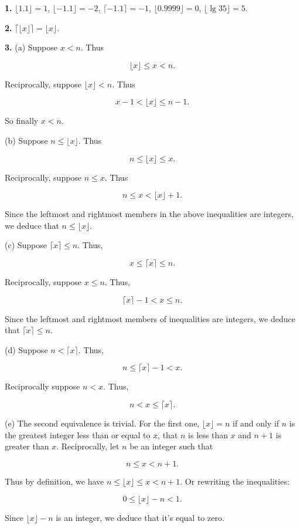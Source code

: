 \documentclass[a4paper,12pt]{article}
\newcommand{\newpar}[1]{\bigskip \noindent \textbf{#1.}}
\newcommand{\subpar}[1]{\medskip \noindent (#1)}
\begin{document}
\newpar{1} $\lfloor 1.1\rfloor = 1$, $\lfloor -1.1\rfloor = -2$,
$\lceil -1.1\rceil = -1$, $\lfloor 0.9999\rfloor = 0$, $\lfloor \lg
35\rfloor = 5$.

\newpar{2} $\lceil \lfloor x\rfloor \rceil = \lfloor x\rfloor$.

\newpar{3}
\subpar{a} Suppose $x < n$.  Thus

\[ \lfloor x\rfloor \le x < n.\]

Reciprocally, suppose $\lfloor x \rfloor < n$.  Thus

\[ x-1 < \lfloor x \rfloor \le n-1.\]

So finally $x < n$.

\medskip
\subpar{b} Suppose $n \le \lfloor x\rfloor$.  Thus

\[ n \le \lfloor x \rfloor \le x.\]

Reciprocally, suppose $n \le x$.  Thus

\[ n \le x < \lfloor x \rfloor + 1.\]

Since the leftmost and rightmost members in the above inequalities are
integers, we deduce that $n \le \lfloor x\rfloor$.

\subpar{c} Suppose $\lceil x\rceil \le n$.  Thus,

\[ x \le \lceil x\rceil \le n.\]

Reciprocally, suppose $x\le n$.  Thus,

\[ \lceil x\rceil - 1 < x \le n.\]

Since the leftmost and rightmost members of inequalities are integers,
we deduce that $\lceil x\rceil \le n$.

\medskip
\subpar{d} Suppose $n < \lceil x\rceil$.  Thus,

\[ n \le \lceil x\rceil - 1 < x.\]

Reciprocally suppose $n < x$.  Thus,

\[ n < x \le \lceil x\rceil.\]

\medskip
\subpar{e}  The second equivalence is trivial.  For the first one,
$\lfloor x\rfloor = n$ if and only if $n$ is the greatest integer less
than or equal to $x$, that $n$ is less than $x$ and $n+1$ is greater
than $x$.  Reciprocally, let $n$ be an integer such that

\[ n \le x < n+1.\]

Thus by definition, we have $n \le \lfloor x\rfloor \le x < n+1$.  Or
rewriting the inequalities:

\[ 0 \le \lfloor x\rfloor - n < 1.\]

Since $\lfloor x\rfloor - n$ is an integer, we deduce that it's equal
to zero.
\end{document}
